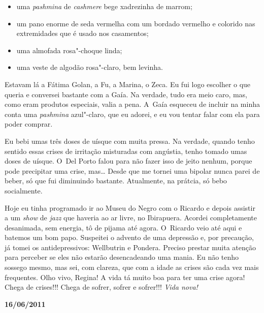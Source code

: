 \begin{itemize}
\item
  uma \emph{pashmina} de \emph{cashmere} bege xadrezinha de marrom;
\item
  um pano enorme de seda vermelha com um bordado vermelho e colorido nas
  extremidades que é usado nos casamentos;
\item
  uma almofada rosa"-choque linda;
\item
  uma veste de algodão rosa"-claro, bem levinha.
\end{itemize}

Estavam lá a Fátima Golan, a Fu, a Marina, o Zeca. Eu fui logo escolher
o que queria e conversei bastante com a Gaía. Na verdade, tudo era meio
caro, mas, como eram produtos especiais, valia a pena. A~Gaía esqueceu
de incluir na minha conta uma \emph{pashmina} azul"-claro, que eu adorei,
e eu vou tentar falar com ela para poder comprar.

Eu bebi umas três doses de uísque com muita pressa. Na verdade, quando
tenho sentido essas crises de irritação misturadas com angústia, tenho
tomado umas doses de uísque. O~Del Porto falou para não fazer isso de
jeito nenhum, porque pode precipitar uma crise, mas… Desde que me
tornei uma bipolar nunca parei de beber, só que fui diminuindo bastante.
Atualmente, na prátcia, só bebo socialmente.

Hoje eu tinha programado ir ao Museu do Negro com o Ricardo e depois
assistir a um \emph{show} de \emph{jazz} que haveria ao ar livre, no
Ibirapuera. Acordei completamente desanimada, sem energia, tô de pijama
até agora. O~Ricardo veio até aqui e batemos um bom papo. Suspeitei o
advento de uma depressão e, por precaução, já tomei os antidepressivos:
Wellbutrin e Pondera. Preciso prestar muita atenção para perceber se
eles não estarão desencadeando uma mania. Eu não tenho sossego mesmo,
mas sei, com clareza, que com a idade as crises são cada vez mais
frequentes. Olho vivo, Regina! A vida tá muito boa para ter uma crise
agora! Chega de crises!!! Chega de sofrer, sofrer e sofrer!!! \emph{Vida
nova!}

\begin{center}\asterisc{}\end{center}

\begin{flushright}\textbf{}\end{flushright}

\begin{flushright}\textbf{16/06/2011}\end{flushright}


